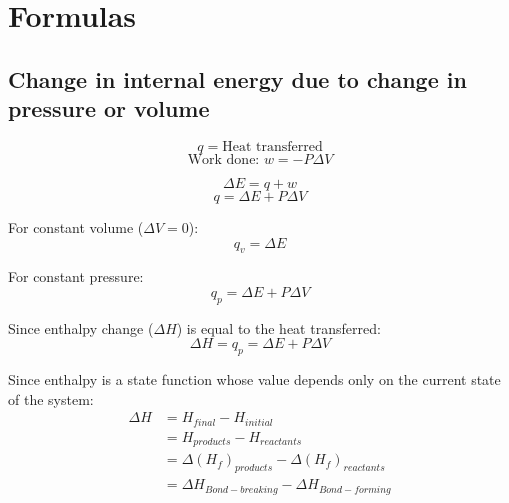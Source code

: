 \documentclass[11pt]{article}
\begin{document}
\newpage
\section{Formulas}
\label{sec:org46305d1}

\subsection{Change in internal energy due to change in pressure or volume}
\label{sec:orgf0d8d97}
\[q = \text{Heat transferred}\]
\[\text{Work done: } w = - P \Delta V\]

\[\Delta E = q + w\]
\[q = \Delta E + P \Delta V\]

For constant volume (\(\Delta V = 0\)):
\[q_v = \Delta E\]

For constant pressure:
\[q_p = \Delta E + P \Delta V\]

Since enthalpy change (\(\Delta H\)) is equal to the heat transferred:
\[\Delta H = q_p = \Delta E + P \Delta V\]

Since enthalpy is a state function whose value depends only on the current state of the system:
\begin{align*}
\Delta H &= H_{final} - H_{initial} \\
&= H_{products} - H_{reactants} \\
&= \Delta (H_f)_{products} - \Delta (H_f)_{reactants} \\
&= \Delta H_{Bond-breaking} - \Delta H_{Bond-forming}
\end{align*}
\end{document}

